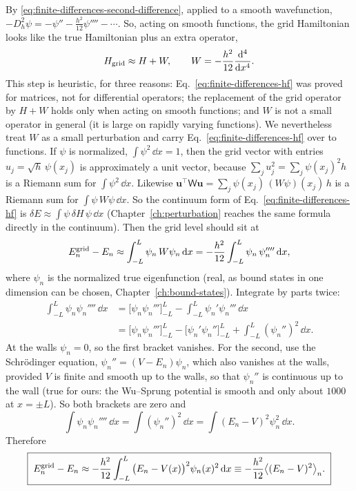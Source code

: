 By \eqref{eq:finite-differences-second-difference}, applied to a smooth wavefunction, $-D_h^2\psi=-\psi''-\tfrac{h^2}{12}\psi''''-\cdots$. So, acting on smooth functions, the grid Hamiltonian looks like the true Hamiltonian plus an extra operator,
\begin{equation*}
H_{\rm grid}\approx H+W,\qquad W=-\frac{h^2}{12}\frac{\mathrm{d}^4}{\mathrm{d} x^4}.
\end{equation*}
This step is heuristic, for three reasons: Eq.~\eqref{eq:finite-differences-hf} was proved for matrices, not for differential operators; the replacement of the grid operator by $H+W$ holds only when acting on smooth functions; and $W$ is not a small operator in general (it is large on rapidly varying functions). We nevertheless treat $W$ as a small perturbation and carry Eq.~\eqref{eq:finite-differences-hf} over to functions. If $\psi$ is normalized, $\int\psi^2\,\dd x=1$, then the grid vector with entries $u_j=\sqrt h\,\psi(x_j)$ is approximately a unit vector, because $\sum_ju_j^2=\sum_j\psi(x_j)^2h$ is a Riemann sum for $\int\psi^2\,\dd x$. Likewise $\mathbf u^\top\mathsf W\mathbf u=\sum_j\psi(x_j)\,(W\psi)(x_j)\,h$ is a Riemann sum for $\int\psi\,W\psi\,\dd x$. So the continuum form of Eq.~\eqref{eq:finite-differences-hf} is $\delta E\approx\int\psi\,\delta H\,\psi\,\dd x$ (Chapter~\ref{ch:perturbation} reaches the same formula directly in the continuum). Then the grid level should sit at
\begin{equation*}
E_n^{\rm grid}-E_n\approx\int_{-L}^{L}\psi_n\,W\psi_n\,\mathrm{d} x=-\frac{h^2}{12}\int_{-L}^{L}\psi_n\,\psi_n''''\,\mathrm{d} x,
\end{equation*}
where $\psi_n$ is the normalized true eigenfunction (real, as bound states in one dimension can be chosen, Chapter~\ref{ch:bound-states}). Integrate by parts twice:
\begin{align*}
\int_{-L}^{L}\psi_n\psi_n''''\,\dd x&=\Big[\psi_n\psi_n'''\Big]_{-L}^{L}-\int_{-L}^{L}\psi_n'\psi_n'''\,\dd x\\
&=\Big[\psi_n\psi_n'''\Big]_{-L}^{L}-\Big[\psi_n'\psi_n''\Big]_{-L}^{L}+\int_{-L}^{L}(\psi_n'')^2\,\dd x.
\end{align*}
At the walls $\psi_n=0$, so the first bracket vanishes. For the second, use the Schr\"odinger equation, $\psi_n''=(V-E_n)\psi_n$, which also vanishes at the walls, provided $V$ is finite and smooth up to the walls, so that $\psi_n''$ is continuous up to the wall (true for ours: the Wu--Sprung potential is smooth and only about $1000$ at $x=\pm L$). So both brackets are zero and
\begin{equation*}
\int\psi_n\psi_n''''\,\dd x=\int(\psi_n'')^2\,\dd x=\int(E_n-V)^2\psi_n^2\,\dd x.
\end{equation*}
Therefore
\begin{equation}
\boxed{\;E_n^{\rm grid}-E_n\approx-\frac{h^2}{12}\int_{-L}^{L}\big(E_n-V(x)\big)^2\psi_n(x)^2\,\mathrm{d} x\equiv-\frac{h^2}{12}\big\langle(E_n-V)^2\big\rangle_n.\;}
\label{eq:finite-differences-bias-estimate}
\end{equation}

